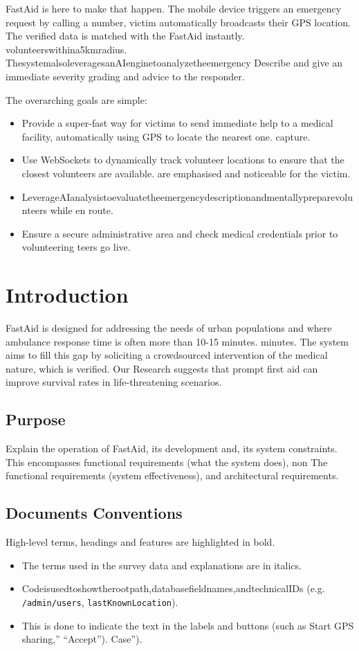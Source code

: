 \documentclass[12pt,a4paper]{article}
\begin{document}
FastAid is here to make that happen. The mobile device triggers an emergency request by calling a number, victim automatically broadcasts their GPS location. The verified data is matched with the FastAid instantly. volunteerswithina5kmradius. ThesystemalsoleveragesanAIenginetoanalyzetheemergency Describe and give an immediate severity grading and advice to the responder. 

The overarching goals are simple:
\begin{itemize}[leftmargin=2em]
  \item Provide a super-fast way for victims to send immediate help to a medical facility, automatically using GPS to locate the nearest one. capture.
  \item Use WebSockets to dynamically track volunteer locations to ensure that the closest volunteers are available. are emphasised and noticeable for the victim.
  \item LeverageAIanalysistoevaluatetheemergencydescriptionandmentallypreparevolunteers while en route.
  \item Ensure a secure administrative area and check medical credentials prior to volunteering teers go live.
\end{itemize}

\section{Introduction}

FastAid is designed for addressing the needs of urban populations and where ambulance response time is often more than 10-15 minutes. minutes. The system aims to fill this gap by soliciting a crowdsourced intervention of the medical nature, which is verified. Our Research suggests that prompt first aid can improve survival rates in life-threatening scenarios.

\subsection{Purpose}
Explain the operation of FastAid, its development and, its system constraints. This encompasses functional requirements (what the system does), non The functional requirements (system effectiveness), and architectural requirements. 

\subsection{Documents Conventions}
High-level terms, headings and features are highlighted in bold.
\begin{itemize}[leftmargin=2em]
  \item The terms used in the survey data and explanations are in italics.
  \item Codeisusedtoshowtherootpath,databasefieldnames,andtechnicalIDs (e.g. \texttt{/admin/users}, \texttt{lastKnownLocation}).
  \item This is done to indicate the text in the labels and buttons (such as Start GPS sharing,” “Accept”). Case”).
\end{itemize}
\end{document}
